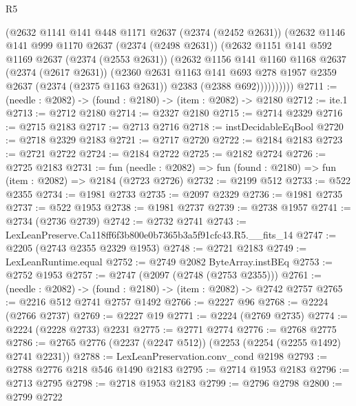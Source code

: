 \begin{lexlean}{R5}
\begin{coremodule}
            (@2632
              @1141
              @141
              @448
              @1171
              @2637
              (@2374 (@2452 @2631))
              (@2632
                @1146
                @141
                @999
                @1170
                @2637
                (@2374 (@2498 @2631))
                (@2632
                  @1151
                  @141
                  @592
                  @1169
                  @2637
                  (@2374 (@2553 @2631))
                  (@2632
                    @1156
                    @141
                    @1160
                    @1168
                    @2637
                    (@2374 (@2617 @2631))
                    (@2360
                      @2631
                      @1163
                      @141
                      @693
                      @278
                      @1957
                      @2359
                      @2637
                      (@2374 (@2375 @1163 @2631))
                      @2383
                      (@2388 @692))))))))))
@2711 := (needle : @2082) -> (found : @2180) -> (item : @2082) -> @2180
@2712 := ite.{1}
@2713 := @2712 @2180
@2714 := @2327 @2180
@2715 := @2714 @2329
@2716 := @2715 @2183
@2717 := @2713 @2716
@2718 := instDecidableEqBool
@2720 := @2718 @2329 @2183
@2721 := @2717 @2720
@2722 := @2184 @2183
@2723 := @2721 @2722
@2724 := @2184 @2722
@2725 := @2182 @2724
@2726 := @2725 @2183
@2731 := fun (needle : @2082) => fun (found : @2180) => fun (item : @2082) => @2184 (@2723 @2726)
@2732 := @2199 @512
@2733 := @522 @2355
@2734 := @1981 @2733
@2735 := @2097 @2329
@2736 := @1981 @2735
@2737 := @522 @1953
@2738 := @1981 @2737
@2739 := @2738 @1957
@2741 := @2734 (@2736 @2739)
@2742 := @2732 @2741
@2743 := LexLeanPreserve.Ca118ff6f3b800e0b7365b3a5f91cfc43.R5.__fits_14
@2747 := @2205 (@2743 @2355 @2329 @1953)
@2748 := @2721 @2183
@2749 := LexLeanRuntime.equal
@2752 := @2749 @2082 ByteArray.instBEq
@2753 := @2752 @1953
@2757 := @2747 (@2097 (@2748 (@2753 @2355)))
@2761 := (needle : @2082) -> (found : @2180) -> (item : @2082) -> @2742 @2757
@2765 := @2216 @512 @2741 @2757 @1492
@2766 := @2227 @96
@2768 := @2224 (@2766 @2737)
@2769 := @2227 @19
@2771 := @2224 (@2769 @2735)
@2774 := @2224 (@2228 @2733) @2231
@2775 := @2771 @2774
@2776 := @2768 @2775
@2786 := @2765 @2776 (@2237 (@2247 @512)) (@2253 (@2254 (@2255 @1492) @2741 @2231))
@2788 := LexLeanPreservation.conv_cond @2198
@2793 := @2788 @2776 @218 @546 @1490 @2183
@2795 := @2714 @1953 @2183
@2796 := @2713 @2795
@2798 := @2718 @1953 @2183
@2799 := @2796 @2798
@2800 := @2799 @2722

\end{coremodule}
\end{lexlean}
